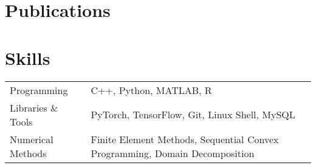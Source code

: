 \documentclass[a4paper,10.5pt]{article}
\begin{document}
\section{Publications}
\begin{refsection}
\nocite{*}
\printbibliography[heading=none]
\end{refsection}

\section{Skills}
\begin{tabularx}{\linewidth}{@{}l X@{}}
Programming &  \normalsize{C++, Python, MATLAB, R}\\
Libraries \& Tools  &  \normalsize{PyTorch, TensorFlow, Git, Linux Shell, MySQL}\\
Numerical Methods & Finite Element Methods, Sequential Convex Programming, Domain Decomposition  
\end{tabularx}

\vfill
{}
\end{document}
